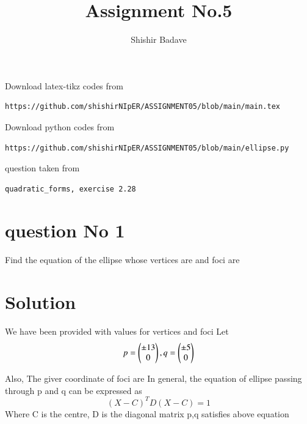 \documentclass[journal,12pt,twocolumn]{IEEEtran}
\begin{document}
\makeatother
\let\StandardTheFigure\thefigure
\let\vec\mathbf
\renewcommand{\thefigure}{\theproblem}
\def\putbox#1#2#3{\makebox[0in][l]{\makebox[#1][l]{}\raisebox{\baselineskip}[0in][0in]{\raisebox{#2}[0in][0in]{#3}}}}
     \def\rightbox#1{\makebox[0in][r]{#1}}
     \def\centbox#1{\makebox[0in]{#1}}
     \def\topbox#1{\raisebox{-\baselineskip}[0in][0in]{#1}}
     \def\midbox#1{\raisebox{-0.5\baselineskip}[0in][0in]{#1}}
\vspace{3cm}
\title{Assignment No.5}
\author{Shishir Badave}
\maketitle
\newpage
\bigskip
\renewcommand{\thefigure}{\theenumi}
\renewcommand{\thetable}{\theenumi}
Download latex-tikz codes from
\begin{lstlisting}
https://github.com/shishirNIpER/ASSIGNMENT05/blob/main/main.tex
\end{lstlisting}
%
Download python codes from
\begin{lstlisting}
https://github.com/shishirNIpER/ASSIGNMENT05/blob/main/ellipse.py
\end{lstlisting}
%
question taken from
\begin{lstlisting}
quadratic_forms, exercise 2.28
\end{lstlisting}
\section{question No 1}
Find the equation of the ellipse whose vertices
are  and foci are 

\section{Solution}
We have been provided with values for vertices and foci
\newline
Let 
$$p=\begin{pmatrix}\pm 13\\0\end{pmatrix},
q=\begin{pmatrix}\pm 5\\0\end{pmatrix}$$

Also, The giver coordinate of foci are 
In general, the equation of ellipse passing through p and q can be expressed as 
$$(X-C)^TD (X-C)=1$$
Where
\newline
C is the centre, D is the diagonal matrix 
p,q satisfies above equation
\end{document}
